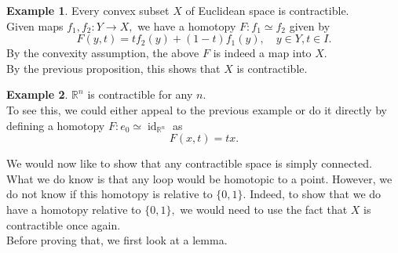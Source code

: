 \documentclass[12pt]{article}
\theoremstyle{definition}
\numberwithin{thm}{section}
\newtheorem{ex}{Example}
\newcommand{\id}{\operatorname{id}}
\begin{document}
\begin{ex}
	Every convex subset $X$ of Euclidean space is contractible.\\
	Given maps $f_1, f_2: Y \to X,$ we have a homotopy $F:f_1 \simeq f_2$ given by
	\begin{equation*} 
		F(y, t) = tf_2(y) + (1 - t)f_1(y), \quad y \in Y, t \in I.
	\end{equation*}
	By the convexity assumption, the above $F$ is indeed a map into $X.$\\
	By the previous proposition, this shows that $X$ is contractible.
\end{ex}
\begin{ex}
	$\mathbb{R}^n$ is contractible for any $n.$\\
	To see this, we could either appeal to the previous example or do it directly by defining a homotopy $F: e_{0} \simeq \id_{\mathbb{R}^n}$ as
	\begin{equation*} 
		F(x, t) = tx.
	\end{equation*}
\end{ex}

We would now like to show that any contractible space is simply connected. What we do know is that any loop would be homotopic to a point. However, we do not know if this homotopy is relative to $\{0, 1\}.$ Indeed, to show that we do have a homotopy relative to $\{0, 1\},$ we would need to use the fact that $X$ is contractible once again.\\
Before proving that, we first look at a lemma.
\end{document}
